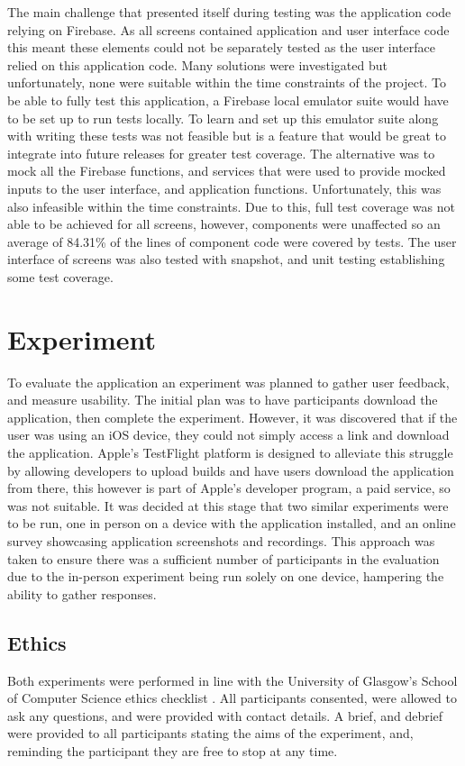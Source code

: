 The main challenge that presented itself during testing was the application code relying on Firebase. As all screens contained application and user interface code this meant these elements could not be separately tested as the user interface relied on this application code. Many solutions were investigated but unfortunately, none were suitable within the time constraints of the project. To be able to fully test this application, a Firebase local emulator suite would have to be set up to run tests locally. To learn and set up this emulator suite along with writing these tests was not feasible but is a feature that would be great to integrate into future releases for greater test coverage. The alternative was to mock all the Firebase functions, and services that were used to provide mocked inputs to the user interface, and application functions. Unfortunately, this was also infeasible within the time constraints. Due to this, full test coverage was not able to be achieved for all screens, however, components were unaffected so an average of 84.31\% of the lines of component code were covered by tests. The user interface of screens was also tested with snapshot, and unit testing establishing some test coverage.   


\section{Experiment}
To evaluate the application an experiment was planned to gather user feedback, and measure usability. The initial plan was to have participants download the application, then complete the experiment. However, it was discovered that if the user was using an iOS device, they could not simply access a link and download the application. Apple's TestFlight platform is designed to alleviate this struggle by allowing developers to upload builds and have users download the application from there, this however is part of Apple's developer program, a paid service, so was not suitable. It was decided at this stage that two similar experiments were to be run, one in person on a device with the application installed, and an online survey showcasing application screenshots and recordings. This approach was taken to ensure there was a sufficient number of participants in the evaluation due to the in-person experiment being run solely on one device, hampering the ability to gather responses. 

\subsection*{Ethics}
Both experiments were performed in line with the University of Glasgow's School of Computer Science ethics checklist \cite{ethics}. All participants consented, were allowed to ask any questions, and were provided with contact details. A brief, and debrief were provided to all participants stating the aims of the experiment, and, reminding the participant they are free to stop at any time.

